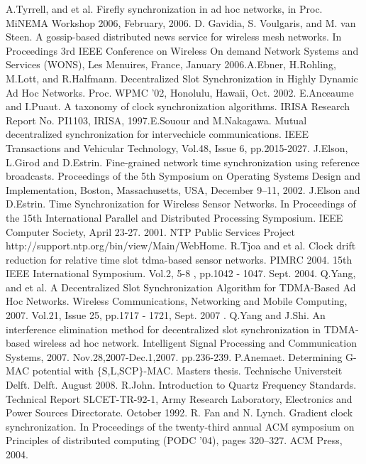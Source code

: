 \documentclass[a4paper,10pt]{report}
\begin{document}
\begin{thebibliography}{\textbf{References}}
A.Tyrrell, and et al. Firefly synchronization in ad hoc networks, in Proc. MiNEMA Workshop 2006, February, 2006.
D. Gavidia, S. Voulgaris, and M. van Steen. A gossip-based distributed news service for wireless mesh networks. In Proceedings 3rd IEEE Conference on Wireless On demand Network Systems and Services (WONS), Les Menuires, France, January 2006.A.Ebner, H.Rohling, M.Lott, and R.Halfmann. Decentralized Slot Synchronization in Highly Dynamic Ad Hoc Networks. Proc. WPMC '02, Honolulu, Hawaii, Oct. 2002.
E.Anceaume and I.Puaut. A taxonomy of clock synchronization algorithms. IRISA Research Report No. PI1103, IRISA, 1997.E.Souour and M.Nakagawa. Mutual decentralized synchronization for intervechicle communications. IEEE Transactions and Vehicular Technology, Vol.48, Issue 6, pp.2015-2027.
J.Elson, L.Girod and D.Estrin. Fine-grained network time synchronization using reference broadcasts. Proceedings of the 5th Symposium on Operating Systems Design and Implementation, Boston, Massachusetts, USA, December 9–11, 2002.
J.Elson and D.Estrin. Time Synchronization for Wireless Sensor Networks. In Proceedings of the 15th International Parallel and Distributed Processing Symposium. IEEE Computer Society, April 23-27. 2001.
NTP Public Services Project http://support.ntp.org/bin/view/Main/WebHome.
 R.Tjoa and et al. Clock drift reduction for relative time slot tdma-based sensor networks. PIMRC 2004. 15th IEEE International Symposium. Vol.2, 5-8 , pp.1042 - 1047. Sept. 2004.
Q.Yang, and et al. A Decentralized Slot Synchronization Algorithm for TDMA-Based Ad Hoc Networks. Wireless Communications, Networking and Mobile Computing, 2007. Vol.21, Issue 25, pp.1717 - 1721, Sept. 2007 .
Q.Yang and J.Shi. An interference elimination method for decentralized slot synchronization in TDMA-based wireless ad hoc network. Intelligent Signal Processing and Communication Systems, 2007. Nov.28,2007-Dec.1,2007. pp.236-239.
P.Anemaet. Determining G-MAC potential with $\{$S,L,SCP$\}$-MAC. Masters thesis. Technische Universteit Delft. Delft. August 2008.
R.John. Introduction to Quartz Frequency Standards. Technical Report SLCET-TR-92-1, Army Research Laboratory, Electronics and Power Sources Directorate. October 1992.
R. Fan and N. Lynch. Gradient clock synchronization. In Proceedings of the twenty-third annual ACM symposium on Principles of distributed computing (PODC ’04), pages 320–327. ACM Press, 2004.

\end{thebibliography}
\end{document}
